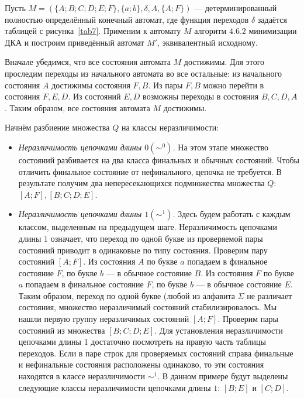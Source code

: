 \begin{myexample}
Пусть $M=(\{A;B;C;D;E;F\},\{a;b\},\delta,A,\{A;F\})$ --- детерминированный полностью определённый конечный автомат, где функция переходов $\delta$ задаётся таблицей с рисунка~\ref{tab7}. Применим к автомату $M$ алгоритм $4.6.2$ минимизации ДКА и построим приведённый автомат $M'$, эквивалентный исходному.

Вначале убедимся, что все состояния автомата $M$ достижимы. Для этого проследим переходы из начального автомата во все остальные: из начального состояния $A$ достижимы состояния $F, B$. Из пары $F, B$ можно перейти в состояния $F, E, D$. Из состояний $E, D$ возможны переходы в состояния $B, C, D, A$. Таким образом, все состояния автомата $M$ достижимы.

Начнём разбиение множества $Q$ на классы неразличимости:
\begin{itemize}
\item \textit{Неразличимость цепочками длины $0 (\sim^0)$.} На этом этапе множество состояний разбивается на два класса финальных и обычных состояний. Чтобы отличить финальное состояние от нефинального, цепочка не требуется. В результате получим два непересекающихся подмножества множества $Q$: $[A;F], [B;C;D;E]$.
\item \textit{Неразличимость цепочками длины $1 (\sim^1)$.} Здесь будем работать с каждым классом, выделенным на предыдущем шаге. Неразличимость цепочками длины $1$ означает, что переход по одной букве из проверяемой пары состояний приводит в одинаковые по типу состояния. Проверим пару состояний $[A;F]$. Из состояния $A$ по букве $a$ попадаем в финальное состояние $F$, по букве $b$ --- в обычное состояние $B$. Из состояния $F$ по букве $a$ попадаем в финальное состояние $F$, по букве $b$ --- в обычное состояние $E$. Таким образом, переход по одной букве (любой из алфавита $\Sigma$ не различает состояния, множество неразличимый состояний стабилизировалось. Мы нашли первую группу неразличимых состояний $[A;F]$. Проверим пары состояний из множества $[B;C;D;E]$. Для установления неразличимости цепочками длины 1 достаточно посмотреть на правую часть таблицы переходов. Если в паре строк для проверяемых состояний справа финальные и нефинальные состояния расположены одинаково, то эти состояния находятся в классе неразличимости $\sim^1$. В данном примере будут выделены следующие классы неразличимости цепочками длины $1$: $[B;E]$ и $[C;D]$.

\begin{figure}[t]


\end{figure}
\end{itemize}
\end{myexample}
